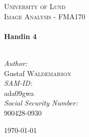 \begin{titlepage}

\begin{center}

\textsc{\LARGE University of Lund}\\[1.5cm]

%    

\textsc{\Large Image Analysis - FMA170}\\[0.5cm]
\HRule \\[0.4cm]
{ \huge \bfseries Handin 4}\\[0.4cm]

\HRule \\[1.5cm]
\begin{minipage}{0.4\textwidth}
\begin{flushleft} \large
\emph{Author:}\\
Gustaf \textsc{Waldemarson}\\
\emph{SAM-ID:}\\
ada09gwa\\
\emph{Social Security Number:}\\
900428-0930
\end{flushleft}
\end{minipage}

\vfill

{\large \today}

\end{center}

\end{titlepage}
